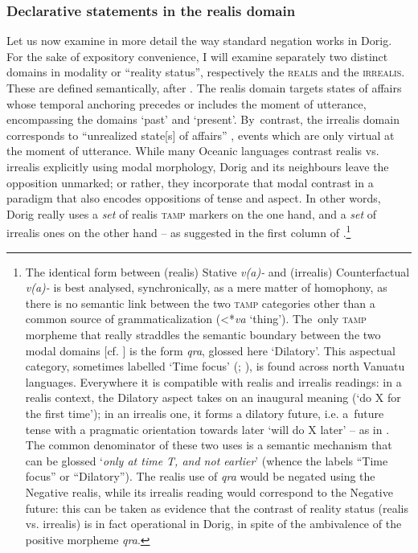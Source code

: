 \documentclass[output=paper,colorlinks,citecolor=brown,draft]{langscibook}
\begin{document}
\subsubsection{Declarative statements in the realis domain}\label{sec:dor:2.1.3}

Let us now examine in more detail the way standard negation works in Dorig. For the sake of expository convenience, I will examine separately two distinct domains in modality or “reality status”, respectively the \textsc{realis} and the \textsc{irrealis}. These are defined semantically, after \citet{Elliott2000}. The realis domain targets states of affairs whose temporal anchoring precedes or includes the moment of utterance, encompassing the domains ‘past’ and ‘present’. By~contrast, the \mbox{irrealis} domain corresponds to “unrealized state[s] of affairs” \citep{Cristofaro2012}, events which are only virtual at the moment of utterance. While many Oceanic languages contrast realis vs. irrealis explicitly using modal morphology, Dorig and its neighbours leave the opposition unmarked; or rather, they incorporate that modal contrast in a paradigm that also encodes oppositions of tense and aspect. In other words, Dorig really uses a \textit{set} of realis \textsc{tamp} markers on the one hand, and a \textit{set} of irrealis ones on the other hand – as suggested in the first column of .\footnote{\label{fnt:ftn9} The identical form between (realis) Stative \textit{v(a)-} and (irrealis) Counterfactual \textit{v(a)-} is best analysed, synchronically, as a mere matter of homophony, as there is no semantic link between the two \textsc{tamp} categories other than a common source of grammaticalization (<*\textit{va} ‘thing’). The~only \textsc{tamp} morpheme that really straddles the semantic boundary between the two modal domains [cf. ] is the form \textit{qra}, glossed here ‘Dilatory’. This aspectual category, sometimes labelled ‘Time focus’ (\citealt[199--216]{François2003}; \citeyear[221--223]{François2021}), is found across north Vanuatu languages. Everywhere it is compatible with realis and irrealis readings: in a realis context, the Dilatory aspect takes on an inaugural meaning (‘do X for the first time’); in an irrealis one, it forms a dilatory future, i.e. a~future tense with a pragmatic orientation towards later ‘will do X later’ – as in . The common denominator of these two uses is a semantic mechanism that can be glossed ‘\textit{only at time T, and not earlier}’ (whence the labels “Time focus” or “Dilatory”). The realis use of \textit{qra} would be negated using the Negative realis, while its irrealis reading would correspond to the Negative future: this can be taken as evidence that the contrast of reality status (realis vs. irrealis) is in fact operational in Dorig, in spite of the ambivalence of the positive morpheme \textit{qra}.} 
\end{document}
